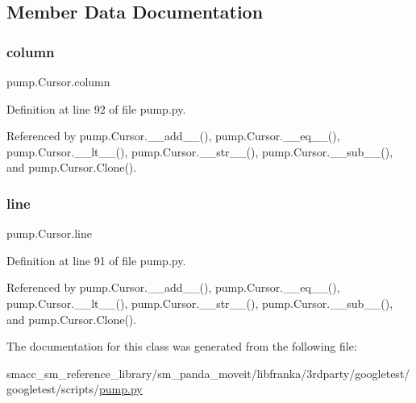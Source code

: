 \subsection{Member Data Documentation}
\mbox{\label{classpump_1_1Cursor_ae73db76c3a845a82afb334633864254e}} 
\subsubsection{\texorpdfstring{column}{column}}
{\footnotesize\ttfamily pump.\+Cursor.\+column}



Definition at line 92 of file pump.\+py.



Referenced by pump.\+Cursor.\+\_\+\+\_\+add\+\_\+\+\_\+(), pump.\+Cursor.\+\_\+\+\_\+eq\+\_\+\+\_\+(), pump.\+Cursor.\+\_\+\+\_\+lt\+\_\+\+\_\+(), pump.\+Cursor.\+\_\+\+\_\+str\+\_\+\+\_\+(), pump.\+Cursor.\+\_\+\+\_\+sub\+\_\+\+\_\+(), and pump.\+Cursor.\+Clone().

\mbox{\label{classpump_1_1Cursor_aee8d8b67360da7fc4e635540cb41d48c}} 
\subsubsection{\texorpdfstring{line}{line}}
{\footnotesize\ttfamily pump.\+Cursor.\+line}



Definition at line 91 of file pump.\+py.



Referenced by pump.\+Cursor.\+\_\+\+\_\+add\+\_\+\+\_\+(), pump.\+Cursor.\+\_\+\+\_\+eq\+\_\+\+\_\+(), pump.\+Cursor.\+\_\+\+\_\+lt\+\_\+\+\_\+(), pump.\+Cursor.\+\_\+\+\_\+str\+\_\+\+\_\+(), pump.\+Cursor.\+\_\+\+\_\+sub\+\_\+\+\_\+(), and pump.\+Cursor.\+Clone().



The documentation for this class was generated from the following file\+:\begin{DoxyCompactItemize}
\item 
smacc\+\_\+sm\+\_\+reference\+\_\+library/sm\+\_\+panda\+\_\+moveit/libfranka/3rdparty/googletest/googletest/scripts/\hyperlink{pump_8py}{pump.\+py}\end{DoxyCompactItemize}

